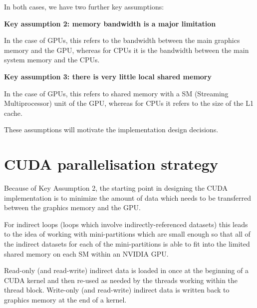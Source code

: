 \documentclass[12pt]{article}
\begin{document}
In both cases, we have two further key assumptions:

\vspace{0.1in}
{\bf Key assumption 2: memory bandwidth is a major limitation}
\vspace{0.1in}

In the case of GPUs, this refers to the bandwidth between the main 
graphics memory and the GPU, whereas for CPUs it is the bandwidth between 
the main system memory and the CPUs.

\vspace{0.1in}
{\bf Key assumption 3: there is very little local shared memory}
\vspace{0.1in}

In the case of GPUs, this refers to shared memory with a SM 
(Streaming Multiprocessor) unit of the GPU, whereas for CPUs it 
refers to the size of the L1 cache.


These assumptions will motivate the implementation design decisions.




\newpage

\section{CUDA parallelisation strategy}

Because of Key Assumption 2, the starting point in designing the 
CUDA implementation is to minimize the amount of data which needs 
to be transferred between the graphics memory and the GPU.

For indirect loops (loops which involve indirectly-referenced datasets)
this leads to the idea of working with mini-partitions which are small 
enough so that all of the indirect datasets for each of the mini-partitions
is able to fit into the limited shared memory on each SM within an NVIDIA 
GPU.  

Read-only (and read-write) indirect data is loaded in once at the beginning 
of a CUDA kernel and then re-used as needed by the threads working within 
the thread block.  Write-only (and read-write) indirect data is written 
back to graphics memory at the end of a kernel.
\end{document}
